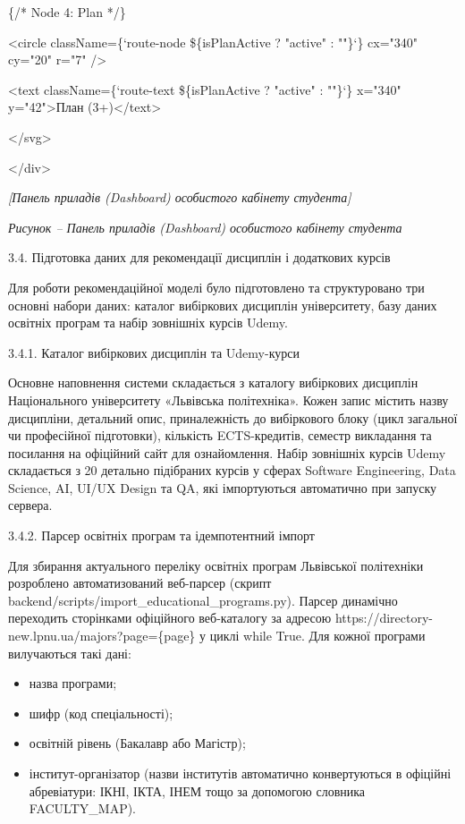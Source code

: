 \documentclass[
]{article}
\begin{document}
\{/* Node 4: Plan */\}

\textless circle className=\{`route-node \$\{isPlanActive ? "active" :
""\}`\} cx="340" cy="20" r="7" /\textgreater{}

\textless text className=\{`route-text \$\{isPlanActive ? "active" :
""\}`\} x="340" y="42"\textgreater План (3+)\textless/text\textgreater{}

\textless/svg\textgreater{}

\textless/div\textgreater{}

\emph{{[}Панель приладів (Dashboard) особистого кабінету студента{]}}

\emph{Рисунок -- Панель приладів (Dashboard) особистого кабінету
студента}

\protect{}\label{_Toc230434099}{}3.4. Підготовка даних для
рекомендації дисциплін і додаткових курсів

Для роботи рекомендаційної моделі було підготовлено та структуровано три
основні набори даних: каталог вибіркових дисциплін університету, базу
даних освітніх програм та набір зовнішніх курсів Udemy.

3.4.1. Каталог вибіркових дисциплін та Udemy-курси

Основне наповнення системи складається з каталогу вибіркових дисциплін
Національного університету «Львівська політехніка». Кожен запис містить
назву дисципліни, детальний опис, приналежність до вибіркового блоку
(цикл загальної чи професійної підготовки), кількість ECTS-кредитів,
семестр викладання та посилання на офіційний сайт для ознайомлення.
Набір зовнішніх курсів Udemy складається з 20 детально підібраних курсів
у сферах Software Engineering, Data Science, AI, UI/UX Design та QA, які
імпортуються автоматично при запуску сервера.

3.4.2. Парсер освітніх програм та ідемпотентний імпорт

Для збирання актуального переліку освітніх програм Львівської
політехніки розроблено автоматизований веб-парсер (скрипт
backend/scripts/import\_educational\_programs.py). Парсер динамічно
переходить сторінками офіційного веб-каталогу за адресою
https://directory-new.lpnu.ua/majors?page=\{page\} у циклі while True.
Для кожної програми вилучаються такі дані:

\begin{itemize}
\item
  назва програми;
\item
  шифр (код спеціальності);
\item
  освітній рівень (Бакалавр або Магістр);
\item
  інститут-організатор (назви інститутів автоматично конвертуються в
  офіційні абревіатури: ІКНІ, ІКТА, ІНЕМ тощо за допомогою словника
  FACULTY\_MAP).
\end{itemize}
\end{document}
